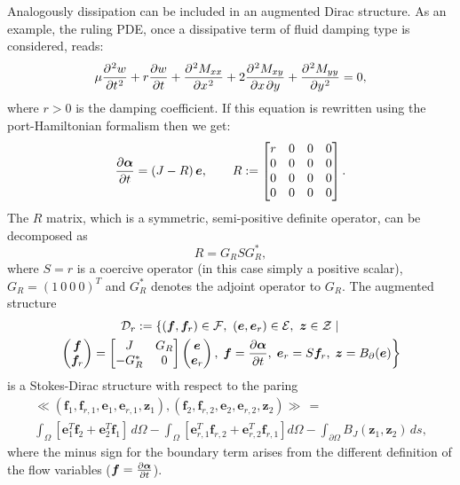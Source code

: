 \documentclass[preprint,12pt]{elsarticle}
\begin{document}
	Analogously dissipation can be included in an augmented Dirac structure. As an example, the ruling PDE, once a dissipative term of fluid damping type is considered, reads:
	\begin{equation}
	\mu \diffp[2]{w}{t}  + r \diffp{w}{t}+ \diffp[2]{M_{xx}}{x} + 2 \diffp{M_{xy}}{x,y} + \diffp[2]{M_{yy}}{y} = 0,
	\end{equation}
	where $r>0$ is the damping coefficient.
	If this equation is rewritten using the port-Hamiltonian formalism then we get:
	\begin{equation}
	\diffp{\bm\alpha}{t} = \left(J - R \right) \bm{e}, \qquad 
	R := 
	\begin{bmatrix}
	r & 0 & 0 & 0 \\
	0 & 0 & 0 & 0 \\
	0 & 0 & 0 & 0 \\
	0 & 0 & 0 & 0 \\
	\end{bmatrix}.
	\end{equation}
	The $R$ matrix, which is a symmetric, semi-positive definite operator, can be decomposed as
	\begin{equation}
	R = G_R S G_R^* , 
	\end{equation}
	where $S=r$ is a coercive operator (in this case simply a positive scalar), $G_R =  \left(1 \ 0 \ 0 \ 0 \right)^T$ and $G_R^*$ denotes the adjoint operator to $G_R$. The augmented structure
	\begin{multline}
	\mathcal{D}_r := \left\{ (\bm{f}, \bm{f}_r) \in \mathcal{F}, \ (\bm{e}, \bm{e}_r) \in \mathcal{E}, \ \bm{z} \in \mathcal{Z} \; |  \right. \\
	\left. 
	\begin{pmatrix}
	\bm{f} \\
	\bm{f}_r \\
	\end{pmatrix}
	= 
	\begin{bmatrix}
	J & G_R \\
	-G_R^* & 0 \\
	\end{bmatrix}
	\begin{pmatrix}
	\bm{e} \\
	\bm{e}_r \\
	\end{pmatrix}, 
	\;\bm{f} = \diffp{\bm{\alpha}}{t}, \; \bm{e}_r = S \bm{f}_r, \;  \bm{z} = B_{\partial}(\bm{e})
	\right\}
	\end{multline}
	is a Stokes-Dirac structure with respect to the paring 
	\begin{multline}
	\ll (\bm{f}_1, \bm{f}_{r, 1}, \bm{e}_1, \bm{e}_{r, 1}, \bm{z}_1), (\bm{f}_2, \bm{f}_{r, 2}, \bm{e}_2, \bm{e}_{r, 2}, \bm{z}_2) \gg  \,= \\
	\int_{\Omega} \left[ \bm{e}_1^T \bm{f}_2 + \bm{e}_2^T \bm{f}_1\right] \,d\Omega - \int_{\Omega} \left[ \bm{e}_{r, 1}^T \bm{f}_{r, 2} + \bm{e}_{r, 2}^T \bm{f}_{r, 1} \right] d\Omega  - \int_{\partial \Omega} B_J(\bm{z}_1, \bm{z}_2) \, ds,
	\end{multline}
	where the minus sign for the boundary term arises from the different definition of the flow variables ($\bm{f}= \diffp{\bm{\alpha}}{t}$).
\end{document}
